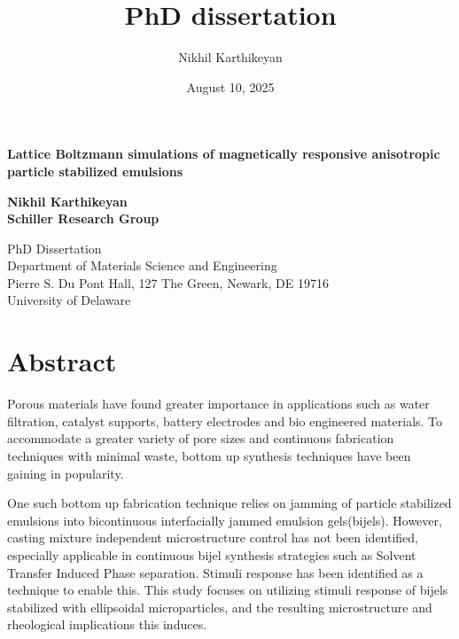 \documentclass[12pt]{book}
\title{PhD dissertation}
\author{Nikhil Karthikeyan}
\date{August 10, 2025}
\begin{document}
\begin{titlepage}
\begin{center}

\vspace*{3cm}

\Large
\textbf{Lattice Boltzmann simulations of magnetically responsive anisotropic particle stabilized emulsions}



\vspace{0.5cm}
\textbf{Nikhil Karthikeyan} \\
\textbf{Schiller Research Group}

\vspace{3cm}

PhD Dissertation \\
Department of Materials Science and Engineering \\
Pierre S. Du Pont Hall, 127 The Green, Newark, DE 19716 \\
University of Delaware

\end{center}
\end{titlepage}

\newpage

\section*{Abstract}
Porous materials have found greater importance in applications such as water filtration, catalyst supports, battery 
electrodes and bio engineered materials. To accommodate a greater variety of pore sizes and continuous fabrication 
techniques with minimal waste, bottom up synthesis techniques have been gaining in popularity. 

One such bottom up fabrication technique relies on jamming of particle stabilized emulsions into bicontinuous 
interfacially jammed emulsion gels(bijels). However, casting mixture independent microstructure control has not 
been identified, especially applicable in continuous bijel synthesis strategies such as Solvent Transfer Induced 
Phase separation. Stimuli response has been identified as a technique to enable this. This study focuses on utilizing 
stimuli response of bijels stabilized with ellipsoidal microparticles, and the resulting microstructure and rheological 
implications this induces. 
\end{document}
